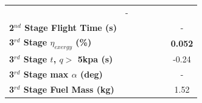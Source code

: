 \begin{table}[ht]
\begin{tabular}{l c c c c c c}
	& -
	\\
	\textbf{2$^{nd}$ Stage Flight Time (s)}
	& \secondFlightTimemSPARTANNinetyFiveNoReturn
	& \secondFlightTimemSPARTANNinetySevenFiveNoReturn
	& \secondFlightTimemSPARTANStandardNoReturn
	& \secondFlightTimemSPARTANOneHundredTwoFiveNoReturn
	& \secondFlightTimemSPARTANOneHundredFiveNoReturn
	& -
	\\
	\hline 
	\textbf{3$^{rd}$ Stage $\eta_{exergy}$ (\%)}
	& \textbf{\thirddExergyEffmSPARTANNinetyFiveNoReturn}
	& \textbf{\thirddExergyEffmSPARTANNinetySevenFiveNoReturn}
	& \textbf{\thirddExergyEffmSPARTANStandardNoReturn}
	& \textbf{\thirddExergyEffmSPARTANOneHundredTwoFiveNoReturn}
	& \textbf{\thirddExergyEffmSPARTANOneHundredFiveNoReturn}
	& \textbf{0.052}
	\\
	\textbf{3$^{rd}$ Stage $t$, $q >$ 5kpa (s)}
	& \thirdqOverFivemSPARTANNinetyFiveNoReturn
	& \thirdqOverFivemSPARTANNinetySevenFiveNoReturn
	& \thirdqOverFivemSPARTANStandardNoReturn
	& \thirdqOverFivemSPARTANOneHundredTwoFiveNoReturn
	& \thirdqOverFivemSPARTANOneHundredFiveNoReturn
	&-0.24
	\\
	\textbf{3$^{rd}$ Stage max $\alpha$ (deg)}
	& \thirdmaxAoAmSPARTANNinetyFiveNoReturn
	& \thirdmaxAoAmSPARTANNinetySevenFiveNoReturn
	& \thirdmaxAoAmSPARTANStandardNoReturn
	& \thirdmaxAoAmSPARTANOneHundredTwoFiveNoReturn
	& \thirdmaxAoAmSPARTANOneHundredFiveNoReturn
	& -
	\\
	\textbf{3$^{rd}$ Stage Fuel Mass (kg)}
	& \thirdmFuelmSPARTANNinetyFiveNoReturn
	& \thirdmFuelmSPARTANNinetySevenFiveNoReturn
	& \thirdmFuelmSPARTANStandardNoReturn
	& \thirdmFuelmSPARTANOneHundredTwoFiveNoReturn
	& \thirdmFuelmSPARTANOneHundredFiveNoReturn
	&1.52
	\\
	\hline 
\end{tabular} 

	
\end{table}


